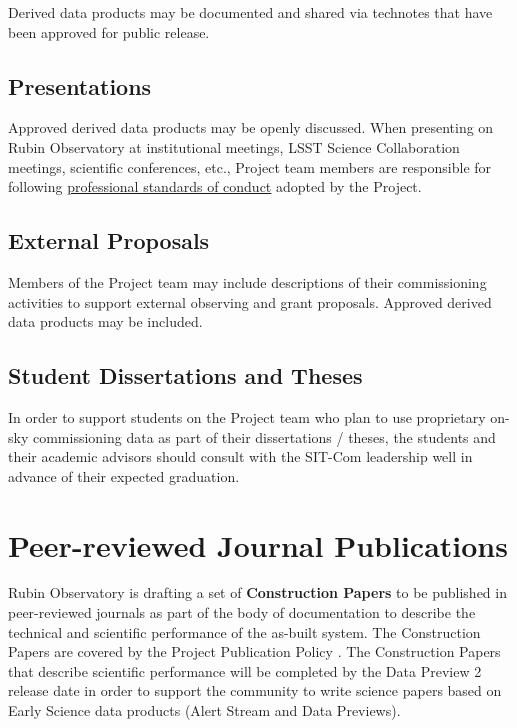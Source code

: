 \documentclass[SE,authoryear,toc,lsstdraft]{lsstdoc}
\begin{document}
Derived data products may be documented and shared via technotes that have been approved for public release.

\subsection{Presentations}

Approved derived data products may be openly discussed.
When presenting on Rubin Observatory at institutional meetings, LSST Science Collaboration meetings, scientific conferences, etc., Project team members are responsible for following \href{https://www.lsst.org/scientists/codes-of-conduct}{professional standards of conduct} adopted by the Project.

\subsection{External Proposals}

Members of the Project team may include descriptions of their commissioning activities to support external observing and grant proposals.
Approved derived data products may be included.

\subsection{Student Dissertations and Theses}

In order to support students on the Project team who plan to use proprietary on-sky commissioning data as part of their dissertations / theses, the students and their academic advisors should consult with the SIT-Com leadership well in advance of their expected graduation.

\section{Peer-reviewed Journal Publications}

Rubin Observatory is drafting a set of \textbf{Construction Papers} to be published in peer-reviewed journals as part of the body of documentation to describe the technical and scientific performance of the as-built system.
The Construction Papers are covered by the Project Publication Policy .
The Construction Papers that describe scientific performance will be completed by the Data Preview 2 release date in order to support the community to write science papers based on Early Science data products (Alert Stream and Data Previews).
\end{document}
